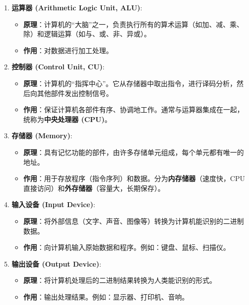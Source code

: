 \documentclass[a4paper,12pt]{article}
\begin{document}
\begin{enumerate}
    \item \textbf{运算器 (Arithmetic Logic Unit, ALU)}: 
    \begin{itemize}
        \item \textbf{原理}：计算机的“大脑”之一，负责执行所有的算术运算（如加、减、乘、除）和逻辑运算（如与、或、非、异或）。
        \item \textbf{作用}：对数据进行加工处理。
    \end{itemize}
    
    \item \textbf{控制器 (Control Unit, CU)}: 
    \begin{itemize}
        \item \textbf{原理}：计算机的“指挥中心”。它从存储器中取出指令，进行译码分析，然后向其他部件发出控制信号。
        \item \textbf{作用}：保证计算机各部件有序、协调地工作。通常与运算器集成在一起，统称为\textbf{中央处理器 (CPU)}。
    \end{itemize}

    \item \textbf{存储器 (Memory)}: 
    \begin{itemize}
        \item \textbf{原理}：具有记忆功能的部件，由许多存储单元组成，每个单元都有唯一的地址。
        \item \textbf{作用}：用于存放程序（指令序列）和数据。分为\textbf{内存储器}（速度快，CPU直接访问）和\textbf{外存储器}（容量大，长期保存）。
    \end{itemize}

    \item \textbf{输入设备 (Input Device)}: 
    \begin{itemize}
        \item \textbf{原理}：将外部信息（文字、声音、图像等）转换为计算机能识别的二进制数据。
        \item \textbf{作用}：向计算机输入原始数据和程序。例如：键盘、鼠标、扫描仪。
    \end{itemize}

    \item \textbf{输出设备 (Output Device)}: 
    \begin{itemize}
        \item \textbf{原理}：将计算机处理后的二进制结果转换为人类能识别的形式。
        \item \textbf{作用}：输出处理结果。例如：显示器、打印机、音响。
    \end{itemize}
\end{enumerate}
\end{document}
